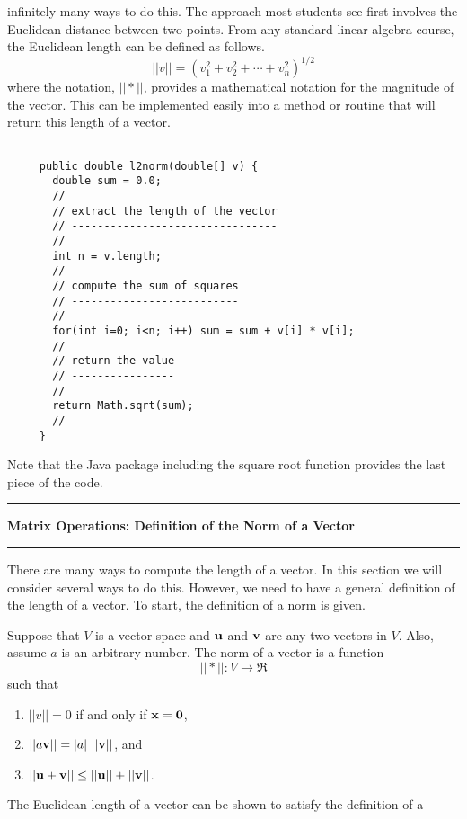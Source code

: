 \documentclass[10pt,fleqn]{article}
\begin{document}
infinitely many ways to do this. The approach most students see first involves
the Euclidean distance between two points. From any standard linear algebra
course, the Euclidean length can be defined as follows.
$$
  || v || = ( v_1^2 + v_2^2 + \cdots + v_n^2 )^{1/2}
$$
where the notation, $||*||$, provides a mathematical notation for the magnitude
of the vector. This can be implemented easily into a method or routine that will
return this length of a vector.
\begin{verbatim}

     public double l2norm(double[] v) {
       double sum = 0.0;
       //
       // extract the length of the vector
       // --------------------------------
       //
       int n = v.length;
       //
       // compute the sum of squares
       // --------------------------
       //
       for(int i=0; i<n; i++) sum = sum + v[i] * v[i];
       //
       // return the value
       // ----------------
       //
       return Math.sqrt(sum);
       //
     }

\end{verbatim}
Note that the Java package including the square root function provides the last
piece of the code.
\newpage
\vskip0.1in\hrule\vskip0.1in
\noindent
{\bf Matrix Operations: Definition of the Norm of a Vector}
\vskip0.1in\hrule\vskip0.1in
\noindent
There are many ways to compute the length of a vector. In this section we will
consider several ways to do this. However, we need to have a general definition
of the length of a vector. To start, the definition of a norm is given.
\begin{definition}
   Suppose that $V$ is a vector space and ${\bf u}$ and ${\bf v}$ are any two
   vectors in $V$. Also, assume $a$ is an arbitrary number. The norm of a vector
   is a function
   $$
     || * || : V \rightarrow \Re
   $$
   such that
   \begin{enumerate}
     \item $||v||=0$ if and only if ${\bf x} = {\bf 0}$,
     \item $||a{\bf v}|| = |a|\ ||{\bf v}||$, and
     \item $||{\bf u} + {\bf v} || \leq ||{\bf u}|| + ||{\bf v}||$.
   \end{enumerate}
\end{definition}
The Euclidean length of a vector can be shown to satisfy the definition of a
\end{document}
